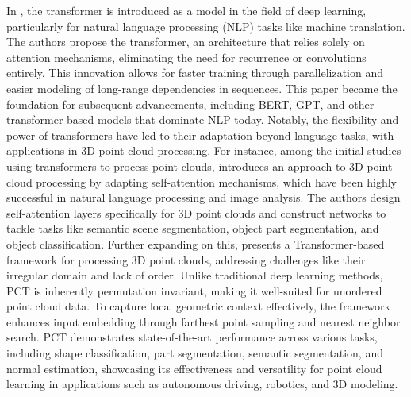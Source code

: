 In \cite{vaswani2017attention}, the transformer is introduced as a model in the field of deep learning, particularly for natural language processing (NLP) tasks like machine translation. The authors propose the transformer, an architecture that relies solely on attention mechanisms, eliminating the need for recurrence or convolutions entirely. This innovation allows for faster training through parallelization and easier modeling of long-range dependencies in sequences. This paper became the foundation for subsequent advancements, including BERT, GPT, and other transformer-based models that dominate NLP today. Notably, the flexibility and power of transformers have led to their adaptation beyond language tasks, with applications in 3D point cloud processing. For instance, among the initial studies using transformers to process point clouds, \cite{zhao2021point} introduces an approach to 3D point cloud processing by adapting self-attention mechanisms, which have been highly successful in natural language processing and image analysis. The authors design self-attention layers specifically for 3D point clouds and construct networks to tackle tasks like semantic scene segmentation, object part segmentation, and object classification. Further expanding on this, \cite{guo2021pct} presents a Transformer-based framework for processing 3D point clouds, addressing challenges like their irregular domain and lack of order. Unlike traditional deep learning methods, PCT is inherently permutation invariant, making it well-suited for unordered point cloud data. To capture local geometric context effectively, the framework enhances input embedding through farthest point sampling and nearest neighbor search. PCT demonstrates state-of-the-art performance across various tasks, including shape classification, part segmentation, semantic segmentation, and normal estimation, showcasing its effectiveness and versatility for point cloud learning in applications such as autonomous driving, robotics, and 3D modeling.

